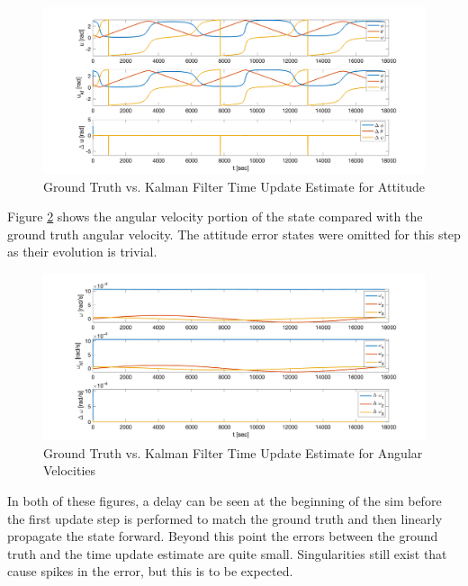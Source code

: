 \begin{figure}[H]
    \centering
    \captionsetup{ justification = centering}
    \includegraphics[width = 15cm]{Images/PS7/kalman_filter_time_update_error_attitude.png}
    \caption{Ground Truth vs. Kalman Filter Time Update Estimate for Attitude}
    \label{fig:kf_quat_prop}
\end{figure}

Figure \ref{fig:kf_omega_prop} shows the angular velocity portion of the state compared with the ground truth angular velocity. The attitude error states were omitted for this step as their evolution is trivial.

\begin{figure}[H]
    \centering
    \captionsetup{ justification = centering}
    \includegraphics[width = 15cm]{Images/PS7/kalman_filter_time_update_error_velocities.png}
    \caption{Ground Truth vs. Kalman Filter Time Update Estimate for Angular Velocities}
    \label{fig:kf_omega_prop}
\end{figure}

In both of these figures, a delay can be seen at the beginning of the sim before the first update step is performed to match the ground truth and then linearly propagate the state forward. Beyond this point the errors between the ground truth and the time update estimate are quite small. Singularities still exist that cause spikes in the   error, but this is to be expected.


